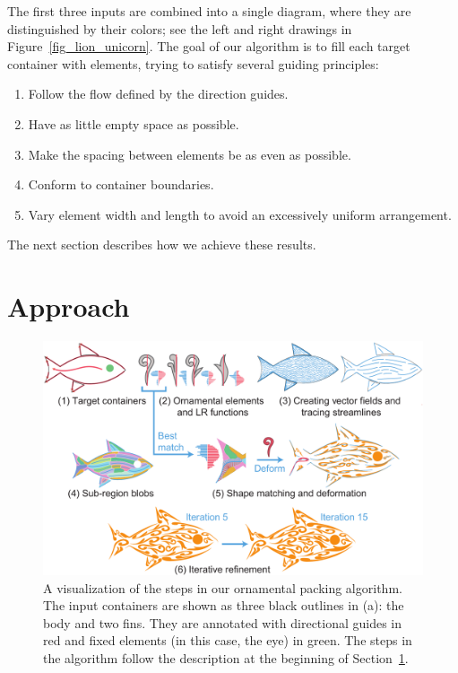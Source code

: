 The first three inputs are combined into a single diagram, where they are
distinguished by their colors; see
the left and right drawings in Figure~\ref{fig_lion_unicorn}.
The goal of our algorithm is to fill each target container with elements,
trying to satisfy several guiding principles:

\begin{enumerate}
	\item Follow the flow defined by the direction guides.
	\item Have as little empty space as possible.
	\item Make the spacing between elements be as even as possible.
	\item Conform to container boundaries.
	\item Vary element width and length to avoid an excessively uniform arrangement.
\end{enumerate}
The next section describes how we achieve these results.

\section{Approach}
\label{flowpak_approach}

\begin{figure}[h!]
\centering
\includegraphics[width=1.0\textwidth]{figures/flowpak/pipeline.pdf} 
\caption[FLOWPAK pipeline]
{\label{fig_flowpak_pipeline} 
A visualization of the steps in our ornamental packing algorithm.
The input containers are shown as three black outlines in (a): the body
and two fins.  They are annotated with directional guides in red and fixed elements (in this 
case, the eye) in green.  The steps in the algorithm follow the
description at the beginning of Section~\ref{flowpak_approach}.
}
\end{figure}

